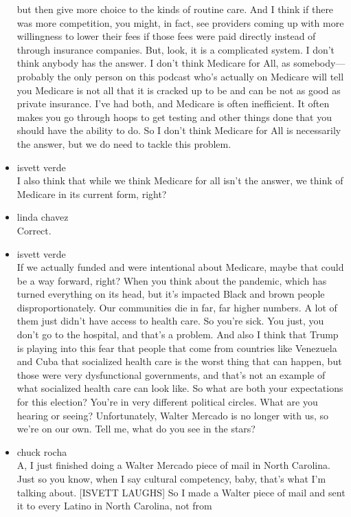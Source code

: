 \begin{itemize}
  but then give more choice to the kinds of routine care. And I think if
  there was more competition, you might, in fact, see providers coming
  up with more willingness to lower their fees if those fees were paid
  directly instead of through insurance companies. But, look, it is a
  complicated system. I don't think anybody has the answer. I don't
  think Medicare for All, as somebody--- probably the only person on
  this podcast who's actually on Medicare will tell you Medicare is not
  all that it is cracked up to be and can be not as good as private
  insurance. I've had both, and Medicare is often inefficient. It often
  makes you go through hoops to get testing and other things done that
  you should have the ability to do. So I don't think Medicare for All
  is necessarily the answer, but we do need to tackle this problem.
\item
  isvett verde\\
  I also think that while we think Medicare for all isn't the answer, we
  think of Medicare in its current form, right?
\item
  linda chavez\\
  Correct.
\item
  isvett verde\\
  If we actually funded and were intentional about Medicare, maybe that
  could be a way forward, right? When you think about the pandemic,
  which has turned everything on its head, but it's impacted Black and
  brown people disproportionately. Our communities die in far, far
  higher numbers. A lot of them just didn't have access to health care.
  So you're sick. You just, you don't go to the hospital, and that's a
  problem. And also I think that Trump is playing into this fear that
  people that come from countries like Venezuela and Cuba that
  socialized health care is the worst thing that can happen, but those
  were very dysfunctional governments, and that's not an example of what
  socialized health care can look like. So what are both your
  expectations for this election? You're in very different political
  circles. What are you hearing or seeing? Unfortunately, Walter Mercado
  is no longer with us, so we're on our own. Tell me, what do you see in
  the stars?
\item
  chuck rocha\\
  A, I just finished doing a Walter Mercado piece of mail in North
  Carolina. Just so you know, when I say cultural competency, baby,
  that's what I'm talking about. {[}ISVETT LAUGHS{]} So I made a Walter
  piece of mail and sent it to every Latino in North Carolina, not from

\end{itemize}
